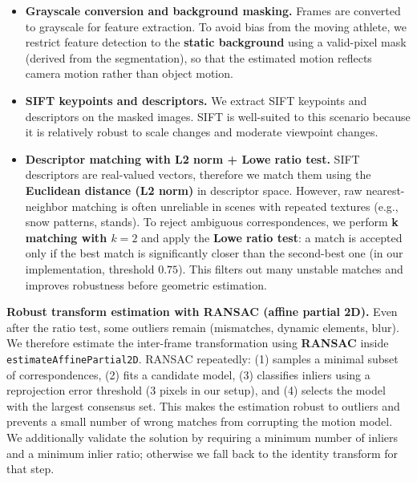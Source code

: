 \begin{itemize}
    \item \textbf{Grayscale conversion and background masking.}  
    Frames are converted to grayscale for feature extraction. To avoid bias from the moving athlete, we restrict feature detection to the \textbf{static background} using a valid-pixel mask (derived from the segmentation), so that the estimated motion reflects camera motion rather than object motion.

    \item \textbf{SIFT keypoints and descriptors.}  
    We extract SIFT keypoints and descriptors on the masked images. SIFT is well-suited to this scenario because it is relatively robust to scale changes and moderate viewpoint changes.

    \item \textbf{Descriptor matching with L2 norm + Lowe ratio test.}  
    SIFT descriptors are real-valued vectors, therefore we match them using the \textbf{Euclidean distance (L2 norm)} in descriptor space. However, raw nearest-neighbor matching is often unreliable in scenes with repeated textures (e.g., snow patterns, stands).  
    To reject ambiguous correspondences, we perform \textbf{k matching with $k=2$} and apply the \textbf{Lowe ratio test}: a match is accepted only if the best match is significantly closer than the second-best one (in our implementation, threshold $0.75$). This filters out many unstable matches and improves robustness before geometric estimation.
\end{itemize}

\medskip

\textbf{Robust transform estimation with RANSAC (affine partial 2D).}  
Even after the ratio test, some outliers remain (mismatches, dynamic elements, blur). We therefore estimate the inter-frame transformation using \textbf{RANSAC} inside \texttt{estimateAffinePartial2D}. RANSAC repeatedly:
(1) samples a minimal subset of correspondences,  
(2) fits a candidate model,  
(3) classifies inliers using a reprojection error threshold (3 pixels in our setup), and  
(4) selects the model with the largest consensus set.  
This makes the estimation robust to outliers and prevents a small number of wrong matches from corrupting the motion model. We additionally validate the solution by requiring a minimum number of inliers and a minimum inlier ratio; otherwise we fall back to the identity transform for that step.

\medskip

